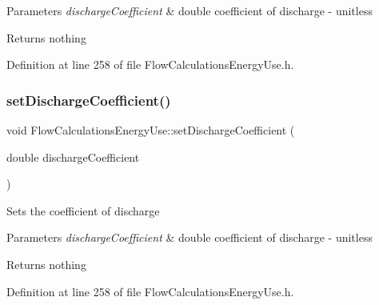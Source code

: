 \begin{DoxyParams}{Parameters}
{\em discharge\+Coefficient} & double coefficient of discharge -\/ unitless\\
\hline
\end{DoxyParams}
\begin{DoxyReturn}{Returns}
nothing 
\end{DoxyReturn}


Definition at line 258 of file Flow\+Calculations\+Energy\+Use.\+h.

\mbox{\label{class_flow_calculations_energy_use_aaa0b642f4cb22b3b74acd8a5d473a107}} 
\subsubsection{\texorpdfstring{set\+Discharge\+Coefficient()}{setDischargeCoefficient()}\hspace{0.1cm}{\footnotesize\ttfamily [2/3]}}
{\footnotesize\ttfamily void Flow\+Calculations\+Energy\+Use\+::set\+Discharge\+Coefficient (\begin{DoxyParamCaption}\item[{double}]{discharge\+Coefficient }\end{DoxyParamCaption})\hspace{0.3cm}{\ttfamily [inline]}}

Sets the coefficient of discharge


\begin{DoxyParams}{Parameters}
{\em discharge\+Coefficient} & double coefficient of discharge -\/ unitless\\
\hline
\end{DoxyParams}
\begin{DoxyReturn}{Returns}
nothing 
\end{DoxyReturn}


Definition at line 258 of file Flow\+Calculations\+Energy\+Use.\+h.

\mbox{\label{class_flow_calculations_energy_use_aaa0b642f4cb22b3b74acd8a5d473a107}} 
